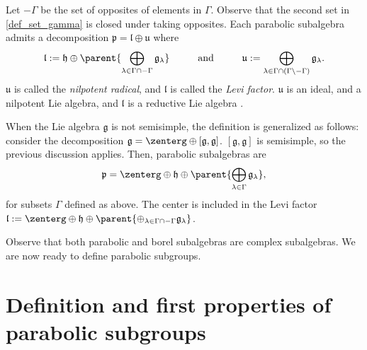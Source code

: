 Let \(-\Gamma\) be the set of opposites of elements in \(\Gamma\). Observe that the second set in \eqref{def_set_gamma} is closed under taking opposites. Each parabolic subalgebra admits a decomposition \(\mathfrak{p}=\mathfrak{l} \oplus \mathfrak{u}\) where
\begin{equation} \label{eq_def_levi_factor}
\mathfrak{l}:= \mathfrak{h} \oplus \parent{\bigoplus_{\lambda \in \Gamma \cap -\Gamma} \mathfrak{g}_\lambda} \hspace{1 cm} \text{and} \hspace{1 cm} \mathfrak{u}:= \bigoplus_{\lambda \in \Gamma \cap (\Gamma \setminus - \Gamma)} \mathfrak{g}_\lambda.
\end{equation}
\(\mathfrak{u}\) is called the \textit{nilpotent radical}, and \(\mathfrak{l}\) is called the \textit{Levi factor}. \(\mathfrak{u}\) is an ideal, and a nilpotent Lie algebra, and \(\mathfrak{l}\) is a reductive Lie algebra \parencite[Cor. 5.94]{knapp2013lie}.

\begin{obs}
    When the Lie algebra \(\mathfrak{g}\) is not semisimple, the definition is generalized as follows: consider the decomposition \(\mathfrak{g}=\zenterg\oplus [\mathfrak{g}, \mathfrak{g}]\). \([\mathfrak{g}, \mathfrak{g}]\) is semisimple, so the previous discussion applies. Then, parabolic subalgebras are
    \[
    \mathfrak{p}=\zenterg \oplus \mathfrak{h} \oplus \parent{\bigoplus_{\lambda \in \Gamma} \mathfrak{g}_\lambda},
    \]
    for subsets \(\Gamma\) defined as above. The center is included in the Levi factor \(\mathfrak{l}:=\zenterg \oplus \mathfrak{h} \oplus \parent{\oplus_{\lambda \in \Gamma \cap -\Gamma} \mathfrak{g}_\lambda}\).
\end{obs}

Observe that both parabolic and borel subalgebras are complex subalgebras. We are now ready to define parabolic subgroups.

\section{Definition and first properties of parabolic subgroups} 


